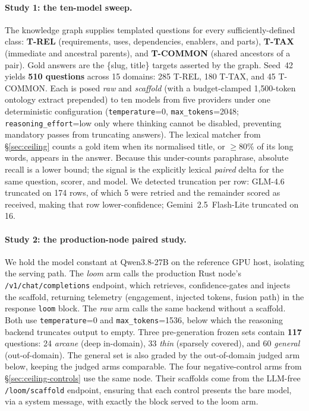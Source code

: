 \documentclass[10pt,twocolumn]{article}
\begin{document}
\paragraph{Study 1: the ten-model sweep.} The knowledge graph supplies templated questions for every sufficiently-defined class: \textbf{T-REL} (requirements, uses, dependencies, enablers, and parts), \textbf{T-TAX} (immediate and ancestral parents), and \textbf{T-COMMON} (shared ancestors of a pair). Gold answers are the \{slug, title\} targets asserted by the graph. Seed~42 yields \textbf{510 questions} across 15 domains: 285 T-REL, 180 T-TAX, and 45 T-COMMON. Each is posed \emph{raw} and \emph{scaffold} (with a budget-clamped 1{,}500-token ontology extract prepended) to ten models from five providers under one deterministic configuration (\texttt{temperature}=0, \texttt{max\_tokens}=2048; \texttt{reasoning\_effort}=low only where thinking cannot be disabled, preventing mandatory passes from truncating answers). The lexical matcher from \S\ref{sec:ceiling} counts a gold item when its normalised title, or $\geq80\%$ of its long words, appears in the answer. Because this under-counts paraphrase, absolute recall is a lower bound; the signal is the explicitly lexical \emph{paired} delta for the same question, scorer, and model. We detected truncation per row: GLM-4.6 truncated on 174 rows, of which 5 were retried and the remainder scored as received, making that row lower-confidence; Gemini~2.5~Flash-Lite truncated on 16.

\paragraph{Study 2: the production-node paired study.} We hold the model constant at Qwen3.8-27B on the reference GPU host, isolating the serving path. The \emph{loom} arm calls the production Rust node's \texttt{/v1/chat/completions} endpoint, which retrieves, confidence-gates and injects the scaffold, returning telemetry (engagement, injected tokens, fusion path) in the response \texttt{loom} block. The \emph{raw} arm calls the same backend without a scaffold. Both use \texttt{temperature}=0 and \texttt{max\_tokens}=1536, below which the reasoning backend truncates output to empty. Three pre-generation frozen sets contain \textbf{117} questions: 24 \emph{arcane} (deep in-domain), 33 \emph{thin} (sparsely covered), and 60 \emph{general} (out-of-domain). The general set is also graded by the out-of-domain judged arm below, keeping the judged arms comparable. The four negative-control arms from \S\ref{sec:ceiling-controls} use the same node. Their scaffolds come from the LLM-free \texttt{/loom/scaffold} endpoint, ensuring that each control presents the bare model, via a system message, with exactly the block served to the loom arm.
\end{document}
